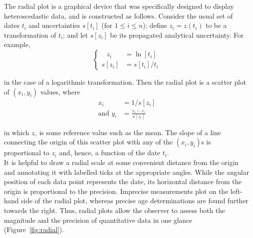 \begin{refsection}
The radial plot is a graphical device that was specifically designed
to display heteroscedastic data, and is constructed as follows.
Consider the usual set of dates $t_i$ and uncertainties $s[t_i]$ (for
$1 \leq i \leq n$); define $z_i = z(t_i)$ to be a transformation of
$t_i$; and let $s[z_i]$ be its propagated analytical uncertainty.
For example,
\begin{equation}
  \begin{cases}
  \phantom{s[}z_i\phantom{]}\! & \! = \ln[t_i]\\
  s[z_i]\! & \! = s[t_i]/t_i
  \end{cases}
  \label{eq:logtransform}
\end{equation}

\noindent in the case of a logarithmic transformation. Then the radial
plot is a scatter plot of $(x_i,y_i)$ values, where
\begin{equation}
  \begin{split}
    x_i & = 1/s[z_i] \\
    \mbox{and~} y_i & = \frac{z_i-z_\circ}{s[z_i]}
  \end{split}
  \label{eq:radial}
\end{equation}

\noindent in which $z_\circ$ is some reference value such
as the mean. The slope of a line connecting the origin of this scatter
plot with any of the $(x_i,y_i)$s is proportional to $z_i$ and, hence,
a function of the date $t_i$.\\

It is helpful to draw a radial scale at some convenient distance from
the origin and annotating it with labelled ticks at the appropriate
angles. While the angular position of each data point represents the
date, its horizontal distance from the origin is proportional to the
precision. Imprecise measurements plot on the left-hand side of the
radial plot, whereas precise age determinations are found further
towards the right. Thus, radial plots allow the observer to assess
both the magnitude and the precision of quantitative data in one
glance (Figure~\ref{fig:radial}).


\end{refsection}
